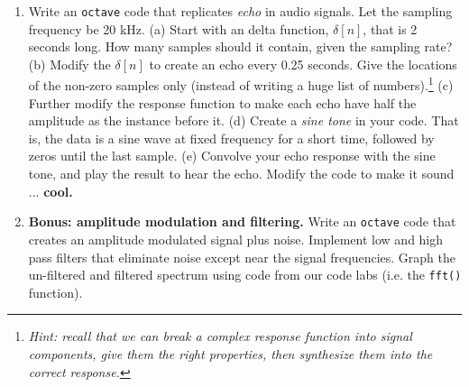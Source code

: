 \documentclass{article}
\begin{document}
\begin{enumerate}
\item Write an \verb+octave+ code that replicates \textit{echo} in audio signals.  Let the sampling frequency be 20 kHz.  (a) Start with an delta function, $\delta[n]$, that is 2 seconds long.  How many samples should it contain, given the sampling rate? (b) Modify the $\delta[n]$ to create an echo every 0.25 seconds. Give the locations of the non-zero samples only (instead of writing a huge list of numbers).\footnote{\textit{Hint: recall that we can break a complex response function into signal components, give them the right properties, then synthesize them into the correct response.}} (c) Further modify the response function to make each echo have half the amplitude as the instance before it. (d) Create a \textit{sine tone} in your code.  That is, the data is a sine wave at fixed frequency for a short time, followed by zeros until the last sample.  (e) Convolve your echo response with the sine tone, and play the result to hear the echo.  Modify the code to make it sound ... \textbf{cool.} \\ \vspace{5cm}
\item \textbf{Bonus: amplitude modulation and filtering.} Write an \verb+octave+ code that creates an amplitude modulated signal plus noise.  Implement low and high pass filters that eliminate noise except near the signal frequencies.  Graph the un-filtered and filtered spectrum using code from our code labs (i.e. the \verb+fft()+ function).
\end{enumerate}
\end{document}
